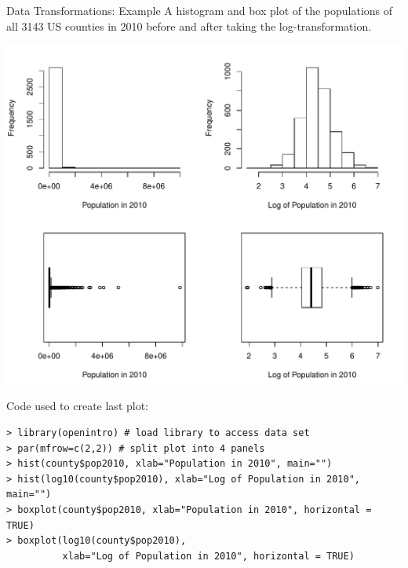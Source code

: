 \documentclass{beamer}
\begin{document}
\begin{frame}{Data Transformations: Example}
A histogram and box plot of the populations of all 3143 US counties in 2010 before and after taking the log-transformation.

\includegraphics[scale=0.45]{county_dist.pdf}
\end{frame}

\begin{frame}[fragile]
\vspace{-2cm}
Code used to create last plot:
\scriptsize
\begin{verbatim}
> library(openintro) # load library to access data set
> par(mfrow=c(2,2)) # split plot into 4 panels
> hist(county$pop2010, xlab="Population in 2010", main="")
> hist(log10(county$pop2010), xlab="Log of Population in 2010", main="")
> boxplot(county$pop2010, xlab="Population in 2010", horizontal = TRUE)
> boxplot(log10(county$pop2010), 
          xlab="Log of Population in 2010", horizontal = TRUE)
\end{verbatim}
\end{frame}
\end{document}

